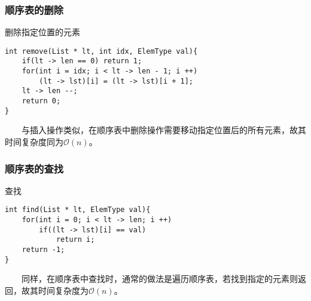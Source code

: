 \documentclass{beamer}
\begin{document}
	\begin{frame}[fragile]\frametitle{顺序表的删除}
		\begin{block}{删除指定位置的元素}
\begin{verbatim}
int remove(List * lt, int idx, ElemType val){
    if(lt -> len == 0) return 1;
    for(int i = idx; i < lt -> len - 1; i ++)
        (lt -> lst)[i] = (lt -> lst)[i + 1];
    lt -> len --;
    return 0;
}
\end{verbatim}
		\end{block}
	\ \ \ \ 与插入操作类似，在顺序表中删除操作需要移动指定位置后的所有元素，故其时间复杂度同为$\mathcal{O}(n)$。
	\end{frame}

	\begin{frame}[fragile]\frametitle{顺序表的查找}
		\begin{block}{查找}
\begin{verbatim}
int find(List * lt, ElemType val){
    for(int i = 0; i < lt -> len; i ++)
        if((lt -> lst)[i] == val)
            return i;
    return -1;
}
\end{verbatim}
		\end{block}
	\ \ \ \ 同样，在顺序表中查找时，通常的做法是遍历顺序表，若找到指定的元素则返回，故其时间复杂度为$\mathcal{O}(n)$。
	\end{frame}
\end{document}

